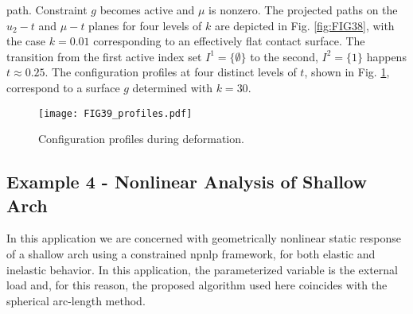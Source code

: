 path. Constraint $g$ becomes active and $\mu$ is nonzero. The projected paths
on the $u_2-t$ and $\mu-t$ planes for four levels of $k$ are
depicted in Fig. \ref{fig:FIG38}, with the case $k=0.01$ corresponding to an 
effectively
flat contact surface. The transition from the first active index set
$I^1=\{\emptyset\}$ to the second, $I^2=\{1\}$ happens $t\approx 0.25$.
The configuration profiles at four distinct levels of $t$, shown in
Fig. \ref{fig:FIG39_Profiles}, correspond to a surface $g$ determined with 
$k=30$.
\begin{figure*}[t]
	\centering
	\qquad
	\caption{Projection of path \textbf{(a)} on $u_2-t$ plane and
		\textbf{(b)} $\mu-t$ plane.}%
	\label{fig:FIG38}%
\end{figure*}
\begin{figure}[b!]
	\centering
	\texttt{[image: FIG39\_profiles.pdf]}
	\caption{Configuration profiles during deformation.}
	\label{fig:FIG39_Profiles}
\end{figure}


\subsection{Example 4 - Nonlinear Analysis of Shallow Arch}

In this application we are concerned with geometrically 
nonlinear static response 
of a shallow arch using a constrained \acrshort{npnlp} framework, for both 
elastic and inelastic behavior. In this application, the parameterized variable 
is the external load and, for this reason, the 
proposed algorithm used here coincides with the spherical arc-length 
method\cite{Crisfield3}.

